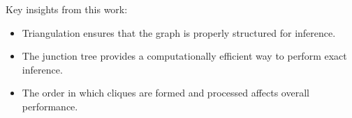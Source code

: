 Key insights from this work:
\begin{itemize}
    \item Triangulation ensures that the graph is properly structured for inference.
    \item The junction tree provides a computationally efficient way to perform exact inference.
    \item The order in which cliques are formed and processed affects overall performance.
\end{itemize}



